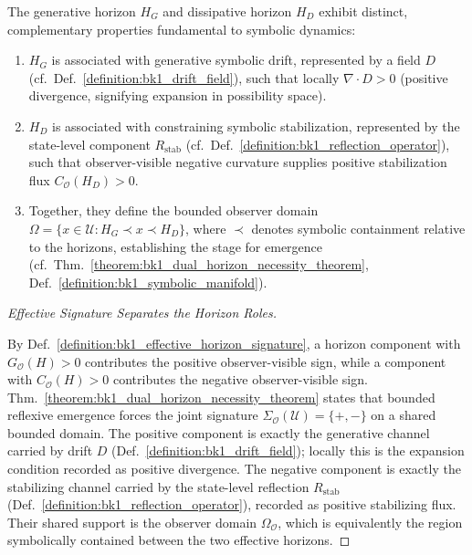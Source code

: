 \begin{lemma}
\label{lemma:bk1_horizon_characterization}
The generative horizon $H_G$ and dissipative horizon $H_D$ exhibit distinct, complementary properties fundamental to symbolic dynamics:
\begin{enumerate}
  \item $H_G$ is associated with generative symbolic drift, represented by a field $D$ (cf.~Def.~\ref{definition:bk1_drift_field}), such that locally $\nabla \cdot D > 0$ (positive divergence, signifying expansion in possibility space).
  \item $H_D$ is associated with constraining symbolic stabilization, represented by the state-level component \(R_{\mathrm{stab}}\) (cf.~Def.~\ref{definition:bk1_reflection_operator}), such that observer-visible negative curvature supplies positive stabilization flux \(C_{\mathcal{O}}(H_D)>0\).
  \item Together, they define the bounded observer domain $\Omega = \{x \in \mathcal{U} : H_G \prec x \prec H_D\}$, where $\prec$ denotes symbolic containment relative to the horizons, establishing the stage for emergence (cf.~Thm.~\ref{theorem:bk1_dual_horizon_necessity_theorem}, Def.~\ref{definition:bk1_symbolic_manifold}).
\end{enumerate}
\end{lemma}
\begin{proof}[Effective Signature Separates the Horizon Roles]
\label{proof:bk1_horizon_characterization}
\leavevmode

By Def.~\ref{definition:bk1_effective_horizon_signature}, a horizon component
with \(G_{\mathcal{O}}(H)>0\) contributes the positive observer-visible sign,
while a component with \(C_{\mathcal{O}}(H)>0\) contributes the negative
observer-visible sign. Thm.~\ref{theorem:bk1_dual_horizon_necessity_theorem}
states that bounded reflexive emergence forces the joint signature
\(\Sigma_{\mathcal{O}}(\mathcal{U})=\{+,-\}\) on a shared bounded domain.
The positive component is exactly the generative channel carried by drift \(D\)
(Def.~\ref{definition:bk1_drift_field}); locally this is the expansion condition
recorded as positive divergence. The negative component is exactly the
stabilizing channel carried by the state-level reflection
\(R_{\mathrm{stab}}\) (Def.~\ref{definition:bk1_reflection_operator}), recorded
as positive stabilizing flux. Their shared support is the observer domain
\(\Omega_{\mathcal{O}}\), which is equivalently the region symbolically
contained between the two effective horizons.
\end{proof}

